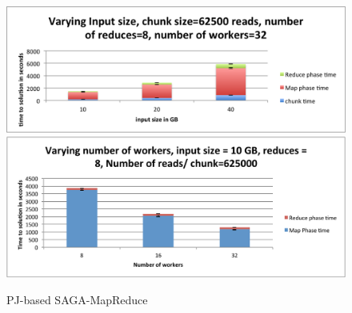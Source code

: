 \documentclass{sig-alternate}
\begin{document}
%
%
%  

\begin{figure}
 \centering
\includegraphics[scale=0.45]{figures/pj-smr-tts.png} 
\includegraphics[scale=0.42]{figures/pj-smr-scale.pdf}


\caption{\small PJ-based SAGA-MapReduce}
  \label{fig:scale-pj-saga-mr} 
\end{figure}
\end{document}

